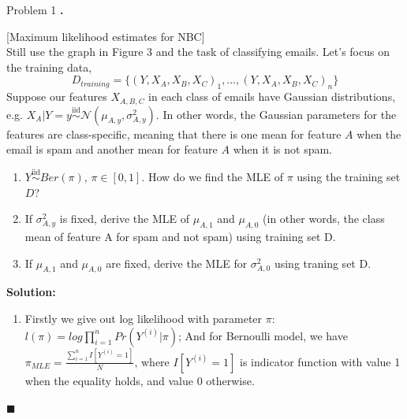 \documentclass{article}
\newcounter{pcounter}                                   %
\newenvironment{problem}                                %
{                                                       %
    \color{gray}                                        %
    \stepcounter{pcounter}                              %
    \textbf{\arabic{pcounter}.}                         %
}{}                                                     %
\newenvironment{solution}                               %
{\textbf{Solution:} }{$\blacksquare$}                   %
\newcommand{\Gaussian}{\mathcal{N}}                     %
\begin{document}
\begin{section}{Problem 1}
        \begin{problem}
            [Maximum likelihood estimates for NBC]\\
            Still use the graph in Figure 3 and the task of classifying emails. Let's focus on the training data,
            $$
                D_{training} = \{ (Y, X_A, X_B, X_C)_1, \dots, (Y, X_A, X_B, X_C)_n \}
            $$
            Suppose our features $X_{A,B,C}$ in each class of emails have Gaussian distributions, e.g. $X_A|Y = y \overset{\mathrm{iid}}{\sim} \Gaussian(\mu_{A,y}, \sigma_{A,y}^2)$.
            In other words, the Gaussian parameters for the features are class-specific, meaning that there is one mean for feature $A$ when the email is spam and another mean for feature $A$ when it is not spam.
            \begin{enumerate}[label=(\alph*)]
                \item $Y \overset{\mathrm{iid}}{\sim} Ber(\pi)$, $\pi \in {[0, 1]}$. How do we find the MLE of $\pi$ using the training set $D$?
                \item If $\sigma_{A,y}^2$ is fixed, derive the MLE of $\mu_{A,1}$ and $\mu_{A,0}$ (in other words, the class mean of feature A for spam and not spam) using training set D.
                \item If $\mu_{A,1}$ and $\mu_{A,0}$ are fixed, derive the MLE for $\sigma_{A,0}^2$ using traning set D.
            \end{enumerate}
        \end{problem}

        \begin{solution}
            \begin{enumerate}[label=(\alph*)]
                \item Firstly we give out log likelihood with parameter $\pi$: $l(\pi) = log \prod_{i=1}^{n} Pr(Y^{(i)} | \pi)$; And for Bernoulli model, we have $\pi_{MLE} = \frac{\sum_{i=1}^{n} I[Y^{(i)}=1]}{N}$, where $I[Y^{(i)}=1]$ is indicator function with value 1 when the equality holds, and value 0 otherwise.


\end{enumerate}
\end{solution}
\end{section}
\end{document}
